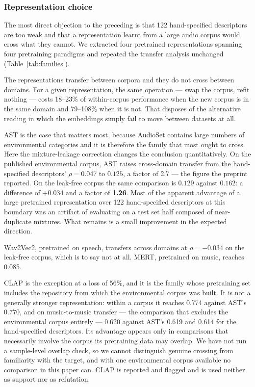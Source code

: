 \subsubsection{Representation choice}

The most direct objection to the preceding is that 122 hand-specified
descriptors are too weak and that a representation learnt from a large audio
corpus would cross what they cannot. We extracted four pretrained
representations spanning four pretraining paradigms and repeated the transfer
analysis unchanged (Table~\ref{tab:families}).

The representations transfer between corpora and they do not cross between
domains. For a given representation, the same operation --- swap the corpus,
refit nothing --- costs 18--23\% of within-corpus performance when the new
corpus is in the same domain and 79--108\% when it is not. That disposes of
the alternative reading in which the embeddings simply fail to move between
datasets at all.

AST is the case that matters most, because AudioSet contains large numbers of
environmental categories and it is therefore the family that most ought to
cross. Here the mixture-leakage correction changes the conclusion
quantitatively. On the published environmental corpus, AST raises cross-domain
transfer from the hand-specified descriptors' $\rho = 0.047$ to $0.125$, a
factor of 2.7 --- the figure the preprint reported. On the leak-free corpus
the same comparison is $0.129$ against $0.162$: a difference of $+0.034$ and a
factor of \textbf{1.26}. Most of the apparent advantage of a large pretrained
representation over 122 hand-specified descriptors at this boundary was an
artifact of evaluating on a test set half composed of near-duplicate mixtures.
What remains is a small improvement in the expected direction.

Wav2Vec2, pretrained on speech, transfers across domains at $\rho = -0.034$ on
the leak-free corpus, which is to say not at all. MERT, pretrained on music,
reaches 0.085.

CLAP is the exception at a loss of 56\%, and it is the family whose
pretraining set includes the repository from which the environmental corpus
was built. It is not a generally stronger representation: within a corpus it
reaches 0.774 against AST's 0.770, and on music-to-music transfer --- the
comparison that excludes the environmental corpus entirely --- 0.620 against
AST's 0.619 and 0.614 for the hand-specified descriptors. Its advantage
appears only in comparisons that necessarily involve the corpus its
pretraining data may overlap. We have not run a sample-level overlap check, so
we cannot distinguish genuine crossing from familiarity with the target, and
with one environmental corpus available no comparison in this paper can.
CLAP is reported and flagged and is used neither as support nor as refutation.

